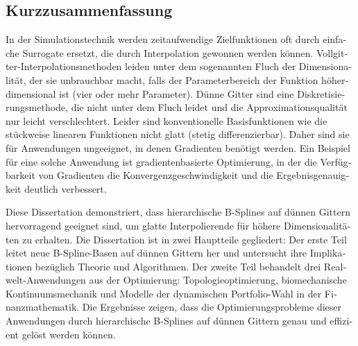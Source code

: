 \begin{otherlanguage}{ngerman}
  \section*{Kurzzusammenfassung}
  
  In der Simulationstechnik werden zeitaufwendige Zielfunktionen
  oft durch einfache Surrogate ersetzt, die durch Interpolation
  gewonnen werden können.
  Vollgitter-Interpola\-tions\-methoden leiden unter dem
  sogenannten Fluch der Dimensionalität,
  der sie unbrauchbar macht, falls der Parameterbereich der Funktion
  höherdimensional ist (vier oder mehr Parameter).
  Dünne Gitter sind eine Diskretisierungsmethode, die nicht unter
  dem Fluch leidet und die Approximationsqualität nur leicht verschlechtert.
  Leider sind konventionelle Basisfunktionen wie die stückweise
  linearen Funktionen nicht glatt (stetig differenzierbar).
  Daher sind sie für Anwendungen ungeeignet, in denen Gradienten
  benötigt werden.
  Ein Beispiel für eine solche Anwendung ist gradientenbasierte Optimierung,
  in der die Verfügbarkeit von Gradienten die Konvergenzgeschwindigkeit und
  die Ergebnisgenauigkeit deutlich verbessert.
  
  Diese Dissertation demonstriert, dass hierarchische B-Splines auf
  dünnen Gittern hervorragend geeignet sind,
  um glatte Interpolierende für höhere Dimensionalitäten zu erhalten.
  Die Dissertation ist in zwei Hauptteile gegliedert:
  Der erste Teil leitet neue B-Spline-Basen auf dünnen Gittern her und
  untersucht ihre Implikationen bezüglich Theorie und Algorithmen.
  Der zweite Teil behandelt drei Realwelt-Anwendungen aus der Optimierung:
  Topologieoptimierung, biomechanische Kontinuumsmechanik und
  Modelle der dynamischen Portfolio-Wahl in der Finanzmathematik.
  Die Ergebnisse zeigen, dass die Optimierungsprobleme dieser
  Anwendungen durch hierarchische B-Splines auf dünnen Gittern
  genau und effizient gelöst werden können.
\end{otherlanguage}

\printornamentstrue
\cleardoublepage
